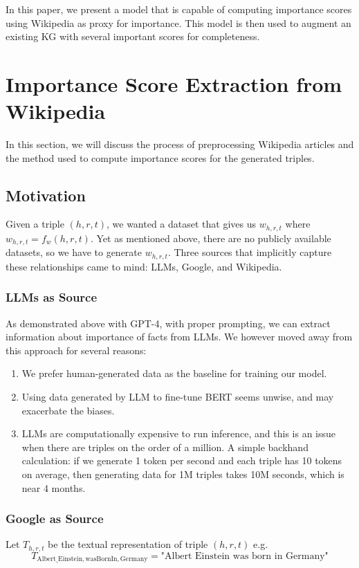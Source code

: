 \documentclass{article}
\begin{document}
In this paper, we present a model that is capable of computing importance scores using Wikipedia as proxy for importance. This model is then used to augment an existing KG with several important scores for completeness.

\section{Importance Score Extraction from Wikipedia}

In this section, we will discuss the process of preprocessing Wikipedia articles and the method used to compute importance scores for the generated triples.

\subsection{Motivation}

Given a triple $(h,r,t)$, we wanted a dataset that gives us $w_{h,r,t}$ where $w_{h,r,t} = f_w(h,r,t)$. Yet as mentioned above, there are no publicly available datasets, so we have to generate $w_{h,r,t}$. Three sources that implicitly capture these relationships came to mind: LLMs, Google, and Wikipedia.

\subsubsection{LLMs as Source}
As demonstrated above with GPT-4, with proper prompting, we can extract information about importance of facts from LLMs. We however moved away from this approach for several reasons:

\begin{enumerate}
\item We prefer human-generated data as the baseline for training our model.
\item Using data generated by LLM to fine-tune BERT seems unwise, and may exacerbate the biases.
\item LLMs are computationally expensive to run inference, and this is an issue when there are triples on the order of a million. A simple backhand calculation: if we generate 1 token per second and each triple has 10 tokens on average, then generating data for 1M triples takes 10M seconds, which is near 4 months.
\end{enumerate}

\subsubsection{Google as Source}
Let $T_{h,r,t}$ be the textual representation of triple $(h,r,t)$ e.g.
\begin{equation*}
  T_{\text{Albert\_Einstein}, \text{wasBornIn}, \text{Germany}} = \text{"Albert Einstein was born in Germany"}
\end{equation*}
\end{document}
